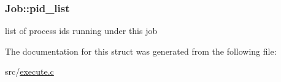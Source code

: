 \subsubsection[{\texorpdfstring{pid\+\_\+list}{pid_list}}]{ Job\+::pid\+\_\+list}\hypertarget{structJob_a4b8bd098708882614988176270f69e10}{}\label{structJob_a4b8bd098708882614988176270f69e10}
list of process ids running under this job 

The documentation for this struct was generated from the following file\+:\begin{DoxyCompactItemize}
\item 
src/\hyperlink{execute_8c}{execute.\+c}\end{DoxyCompactItemize}
